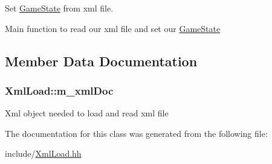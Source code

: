 Set \hyperlink{class_game_state}{Game\+State} from xml file. 

Main function to read our xml file and set our \hyperlink{class_game_state}{Game\+State} 

\subsection{Member Data Documentation}
\hypertarget{class_xml_load_acef322779a50e79c11c783444d38778e}{}
\subsubsection[{m\+\_\+xml\+Doc}]{ Xml\+Load\+::m\+\_\+xml\+Doc\hspace{0.3cm}{\ttfamily [private]}}\label{class_xml_load_acef322779a50e79c11c783444d38778e}
Xml object needed to load and read xml file 

The documentation for this class was generated from the following file\+:\begin{DoxyCompactItemize}
\item 
include/\hyperlink{_xml_load_8hh}{Xml\+Load.\+hh}\end{DoxyCompactItemize}
